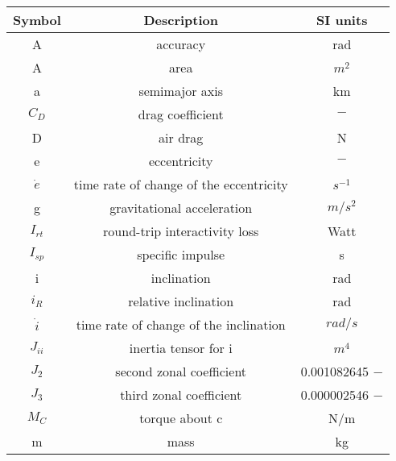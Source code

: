 
\begin{center}
\begin{longtable}{c|c|c}

\textbf{Symbol} & \textbf{Description} & \textbf{SI units} \\\hline\hline
         A &   accuracy &        rad \\

         A &       area &         $m^2$ \\

         a & semimajor axis &         km \\

        $C_D$ & drag coefficient &          $-$ \\

         D &   air drag &          N \\

         e & eccentricity &          $-$ \\

   $\dot e$ & time rate of change of the eccentricity &        $s^{-1}$ \\

         g & gravitational acceleration &       $m/s^2$ \\

       $I_{rt}$ & round-trip interactivity loss &       Watt \\

       $I_{sp}$ & specific impulse &          s \\

         i & inclination &        rad \\

        $i_R$ & relative inclination &        rad \\

   $\dot i$ & time rate of change of the inclination &      $rad/s$ \\

       $J_{ii}$ & inertia tensor for i &         $m^4$ \\

        $J_2$ & second zonal coefficient & 0.001082645 $-$ \\

        $J_3$ & third zonal coefficient & 0.000002546 $-$ \\

        $M_C$ & torque about c &        N/m \\

         m &       mass &         kg \\


\end{longtable}
\end{center}
